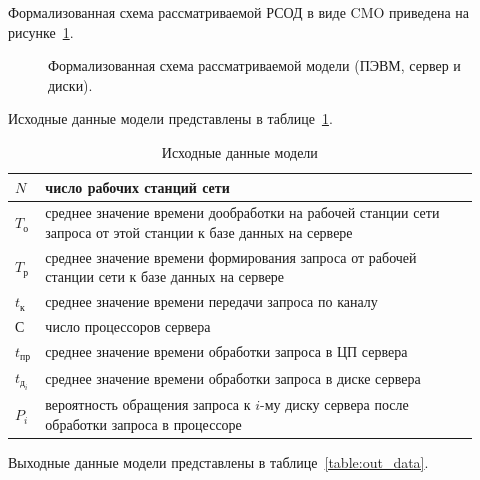 Формализованная схема рассматриваемой РСОД в виде CMO приведена на рисунке~\ref{pic:9_2_model_mine}.

\begin{figure}[h]
\caption{Формализованная схема рассматриваемой модели (ПЭВМ, сервер и диски).}
\label{pic:9_2_model_mine}
\end{figure}

Исходные данные модели представлены в таблице~\ref{table:in_data}.

\begin{table}[h]
\caption{Исходные данные модели}
\label{table:in_data}
\centering
 \begin{tabular}{|m{0.025\linewidth}|m{0.9\linewidth}|}
 \hline $N$ & число рабочих станций сети \\
 \hline $T_{\text{о}}$ & среднее значение времени дообработки на рабочей станции сети запроса от этой станции к базе данных на сервере \\
 \hline $T_{\text{р}}$ & среднее значение времени формирования запроса от рабочей станции сети к базе данных на сервере \\
 \hline $t_{\text{к}}$ & среднее значение времени передачи запроса по каналу \\
 \hline $\text{С}$ & число процессоров сервера \\
 \hline $t_{\text{пр}}$ & среднее значение времени обработки запроса в ЦП сервера \\
 \hline $t_{\text{д}_i}$ & среднее значение времени обработки запроса в диске сервера \\
 \hline $P_i$ & вероятность обращения запроса к $i$-му диску сервера после обработки запроса в процессоре \\
 \hline
 \end{tabular}
\end{table}

Выходные данные модели представлены в таблице~\ref{table:out_data}.

